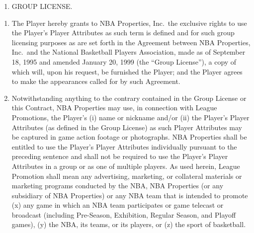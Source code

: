 \documentclass[
]{book}
\providecommand{\tightlist}{%
  \setlength{\itemsep}{0pt}\setlength{\parskip}{0pt}}
\begin{document}
\begin{enumerate}
\def\labelenumi{\arabic{enumi}.}
\setcounter{enumi}{13}
\tightlist
\item
  GROUP LICENSE.
\end{enumerate}

\begin{enumerate}
\def\labelenumi{(\alph{enumi})}
\tightlist
\item
  The Player hereby grants to NBA Properties, Inc.~the exclusive rights to use the Player's Player Attributes as such term is defined and for such group licensing purposes as are set forth in the Agreement between NBA Properties, Inc.~and the National Basketball Players Association, made as of September 18, 1995 and amended January 20, 1999 (the ``Group License''), a copy of which will, upon his request, be furnished the Player; and the Player agrees to make the appearances called for by such Agreement.
\item
  Notwithstanding anything to the contrary contained in the Group License or this Contract, NBA Properties may use, in connection with League Promotions, the Player's (i) name or nickname and/or (ii) the Player's Player Attributes (as defined in the Group License) as such Player Attributes may be captured in game action footage or photographs. NBA Properties shall be entitled to use the Player's Player Attributes individually pursuant to the preceding sentence and shall not be required to use the Player's Player Attributes in a group or as one of multiple players. As used herein, League Promotion shall mean any advertising, marketing, or collateral materials or marketing programs conducted by the NBA, NBA Properties (or any subsidiary of NBA Properties) or any NBA team that is intended to promote (x) any game in which an NBA team participates or game telecast or broadcast (including Pre-Season, Exhibition, Regular Season, and Playoff games), (y) the NBA, its teams, or its players, or (z) the sport of basketball.
\end{enumerate}
\end{document}
